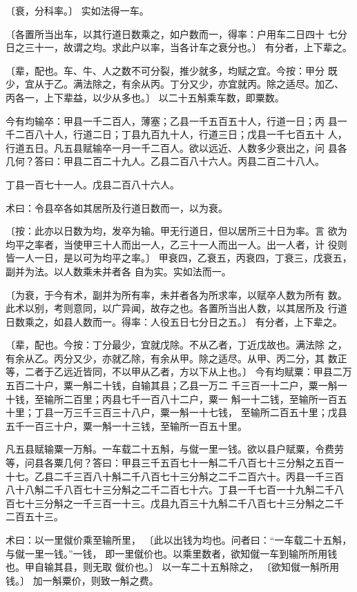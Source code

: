 \documentclass[12pt,UTF8]{ctexbook}
\begin{document}
〔衰，分科率。〕 实如法得一车。

〔各置所当出车，以其行道日数乘之，如户数而一，得率：户用车二日四十 七分日之三十一，故谓之均。求此户以率，当各计车之衰分也。〕 有分者，上下辈之。

〔辈，配也。车、牛、人之数不可分裂，推少就多，均赋之宜。今按：甲分 既少，宜从于乙。满法除之，有余从丙。丁分又少，亦宜就丙。除之适尽。加乙、 丙各一，上下辈益，以少从多也。〕 以二十五斛乘车数，即粟数。

今有均输卒：甲县一千二百人，薄塞；乙县一千五百五十人，行道一日；丙 县一千二百八十人，行道二日；丁县九百九十人，行道三日；戊县一千七百五十 人，行道五日。凡五县赋输卒一月一千二百人。欲以远近、人数多少衰出之，问 县各几何？答曰：甲县二百二十九人。乙县二百八十六人。丙县二百二十八人。

丁县一百七十一人。戊县二百八十六人。

术曰：令县卒各如其居所及行道日数而一，以为衰。

〔按：此亦以日数为均，发卒为输。甲无行道日，但以居所三十日为率。言 欲为均平之率者，当使甲三十人而出一人，乙三十一人而出一人。出一人者，计 役则皆一人一日，是以可为均平之率。〕 甲衰四，乙衰五，丙衰四，丁衰三，戊衰五，副并为法。以人数乘未并者各 自为实。实如法而一。

〔为衰，于今有术，副并为所有率，未并者各为所求率，以赋卒人数为所有 数。此术以别，考则意同，以广异闻，故存之也。各置所当出人数，以其居所及 行道日数乘之，如县人数而一。得率：人役五日七分日之五。〕 有分者，上下辈之。

〔辈，配也。今按：丁分最少，宜就戊除。不从乙者，丁近戊故也。满法除 之，有余从乙。丙分又少，亦就乙除，有余从甲。除之适尽。从甲、丙二分，其 数正等，二者于乙远近皆同，不以甲从乙者，方以下从上也。〕 今有均赋粟：甲县二万五百二十户，粟一斛二十钱，自输其县；乙县一万二 千三百一十二户，粟一斛一十钱，至输所二百里；丙县七千一百八十二户，粟一 斛一十二钱，至输所一百五十里；丁县一万三千三百三十八户，粟一斛一十七钱， 至输所二百五十里；戊县五千一百三十户，粟一斛一十三钱，至输所一百五十里。

凡五县赋输粟一万斛。一车载二十五斛，与僦一里一钱。欲以县户赋粟，令费劳 等，问县各粟几何？答曰：甲县三千五百七十一斛二千八百七十三分斛之五百一 十七。乙县二千三百八十斛二千八百七十三分斛之二千二百六十。丙县一千三百 八十八斛二千八百七十三分斛之二千二百七十六。丁县一千七百一十九斛二千八 百七十三分斛之一千三百一十三。戊县九百三十九斛二千八百七十三分斛之二千 二百五十三。

术曰：以一里僦价乘至输所里， 〔此以出钱为均也。问者曰：“一车载二十五斛，与僦一里一钱。”一钱， 即一里僦价也。以乘里数者，欲知僦一车到输所所用钱也。甲自输其县，则无取 僦价也。〕 以一车二十五斛除之， 〔欲知僦一斛所用钱。〕 加一斛粟价，则致一斛之费。
\end{document}

